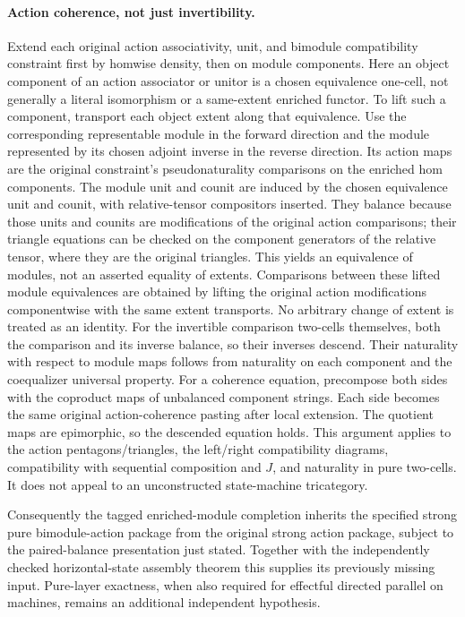 \documentclass{article}
\begin{document}
\paragraph{Action coherence, not just invertibility.} Extend each original action associativity, unit, and bimodule compatibility constraint first by homwise density, then on module components. Here an object component of an action associator or unitor is a chosen equivalence one-cell, not generally a literal isomorphism or a same-extent enriched functor. To lift such a component, transport each object extent along that equivalence. Use the corresponding representable module in the forward direction and the module represented by its chosen adjoint inverse in the reverse direction. Its action maps are the original constraint's pseudonaturality comparisons on the enriched hom components. The module unit and counit are induced by the chosen equivalence unit and counit, with relative-tensor compositors inserted. They balance because those units and counits are modifications of the original action comparisons; their triangle equations can be checked on the component generators of the relative tensor, where they are the original triangles. This yields an equivalence of modules, not an asserted equality of extents. Comparisons between these lifted module equivalences are obtained by lifting the original action modifications componentwise with the same extent transports. No arbitrary change of extent is treated as an identity. For the invertible comparison two-cells themselves, both the comparison and its inverse balance, so their inverses descend. Their naturality with respect to module maps follows from naturality on each component and the coequalizer universal property. For a coherence equation, precompose both sides with the coproduct maps of unbalanced component strings. Each side becomes the same original action-coherence pasting after local extension. The quotient maps are epimorphic, so the descended equation holds. This argument applies to the action pentagons/triangles, the left/right compatibility diagrams, compatibility with sequential composition and $J$, and naturality in pure two-cells. It does not appeal to an unconstructed state-machine tricategory.

Consequently the tagged enriched-module completion inherits the specified strong pure bimodule-action package from the original strong action package, subject to the paired-balance presentation just stated. Together with the independently checked horizontal-state assembly theorem this supplies its previously missing input. Pure-layer exactness, when also required for effectful directed parallel on machines, remains an additional independent hypothesis.
\end{document}
